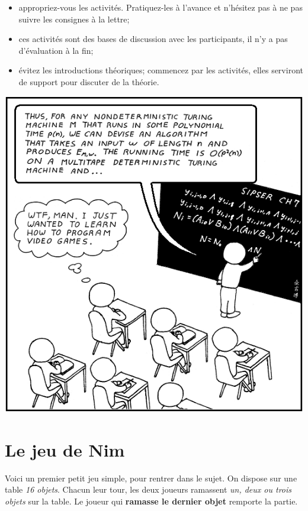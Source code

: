 \documentclass[a5paper,pagesize,DIV=14]{scrbook}
\begin{document}
\begin{itemize}
\item appropriez-vous les activités. Pratiquez-les à l'avance et n'hésitez pas à
  ne pas suivre les consignes à la lettre;
\item ces activités sont des bases de discussion avec les participants, il n'y a
  pas d'évaluation à la fin;
\item évitez les introductions théoriques; commencez par les activités, elles
  serviront de support pour discuter de la théorie.
\end{itemize}

\begin{center}
  \includegraphics[width=0.7\linewidth]{img/computer_science_major.PNG}
  \label{img:CSmajor}
\end{center}

\chapter*{Le jeu de Nim}

Voici un premier petit jeu simple, pour rentrer dans le sujet. On dispose sur
une table \textit{16 objets}. Chacun leur tour, les deux joueurs ramassent
\textit{un, deux ou trois objets} sur la table. Le joueur qui \textbf{ramasse le
  dernier objet} remporte la partie.

\bigskip
 
\end{document}

